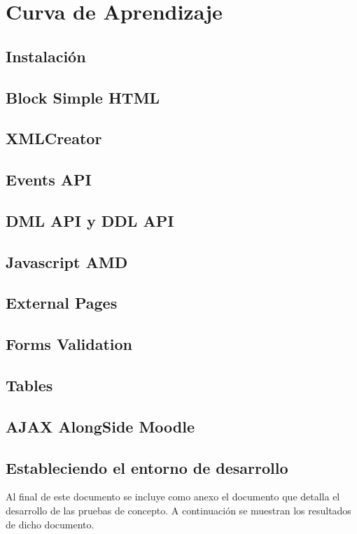 \chapter{Curva de Aprendizaje}
\label{ch:curvaAprendizaje}

\section{Instalación}
\section{Block Simple HTML}
\section{XMLCreator}
\section{Events API}
\section{DML API y DDL API}
\section{Javascript AMD}
\section{External Pages}
\section{Forms Validation}
\section{Tables}
\section{AJAX AlongSide Moodle}

\section{Estableciendo el entorno de desarrollo}

 Al final de este documento se incluye como anexo el documento que detalla el desarrollo de las pruebas de concepto. A continuación se muestran los resultados de dicho documento.

